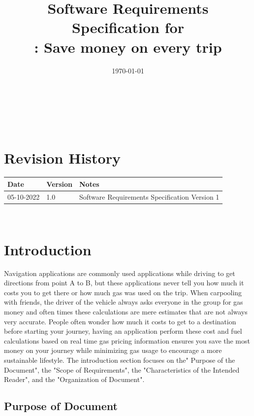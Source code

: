 \documentclass[12pt]{article}
\begin{document}
\title{Software Requirements Specification for \\ \progname: Save money on every trip} 
\author{\authname}
\date{\today}
	
\maketitle

~\newpage


\tableofcontents

~\newpage

\section*{Revision History}

\begin{tabularx}{\textwidth}{p{3cm}p{2cm}X}
\toprule {\bf Date} & {\bf Version} & {\bf Notes}\\
\midrule
05-10-2022 & 1.0 & Software Requirements Specification Version 1\\
\bottomrule
\end{tabularx}

~\newpage


\section{Introduction}

Navigation applications are commonly used applications while driving to get
directions from point A to B, but these applications never tell you how much it
costs you to get there or how much gas was used on the trip. When carpooling
with friends, the driver of the vehicle always asks everyone in the group for gas
money and often times these calculations are mere estimates that are not always
very accurate. People often wonder how much it costs to get to a destination
before starting your journey, having an application perform these cost and fuel
calculations based on real time gas pricing information ensures you save the
most money on your journey while minimizing gas usage to encourage a more
sustainable lifestyle. The introduction section focuses on the" Purpose of the Document", 
the "Scope of Requirements", the "Characteristics of the Intended Reader", 
and the "Organization of Document". 

\subsection{Purpose of Document}
\end{document}
